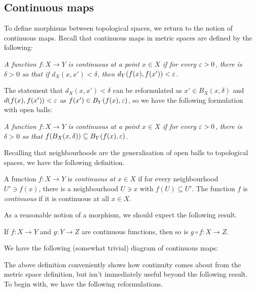 \documentclass[11pt]{article}
\begin{document}
\subsection{Continuous maps}
To define morphisms between topological spaces, we return to the notion of continuous maps. Recall that continuous maps in metric spaces are defined by the following:
\begin{center}
    \emph{A function $f : X \to Y$ is \emph{continuous at a point $x \in X$} if for every $\varepsilon > 0$, there is $\delta > 0$ so that if $d_X(x, x') < \delta$, then $d_Y(f(x), f(x')) < \varepsilon$.}
\end{center}
The statement that $d_X(x, x') < \delta$ can be reformulated as $x' \in B_X(x, \delta)$ and $d(f(x), f(x')) < \varepsilon$ as $f(x') \in B_Y(f(x), \varepsilon)$, so we have the following formulation with open balls:
\begin{center}
    \emph{A function $f : X \to Y$ is \emph{continuous at a point $x \in X$} if for every $\varepsilon > 0$, there is $\delta > 0$ so that $f(B_X(x, \delta)) \subseteq B_Y(f(x), \varepsilon)$.}
\end{center}
Recalling that neighbourhoods are the generalisation of open balls to topological spaces, we have the following definition.
\begin{definition}[Continuous]
    A function $f : X \to Y$ is \emph{continuous at $x \in X$} if for every neighbourhood $U' \ni f(x)$, there is a neighbourhood $U \ni x$ with $f(U) \subseteq U'$. The function $f$ is \emph{continuous} if it is continuous at all $x \in X$.
\end{definition}
As a reasonable notion of a morphism, we should expect the following result.
\begin{lemma}
    If $f : X \to Y$ and $g : Y \to Z$ are continuous functions, then so is $g \circ f : X \to Z$.
\end{lemma}
We have the following (somewhat trivial) diagram of continuous maps:
\begin{center}
\end{center}
The above definition conveniently shows how continuity comes about from the metric space definition, but isn't immediately useful beyond the following result. To begin with, we have the following reformulations.
\end{document}
